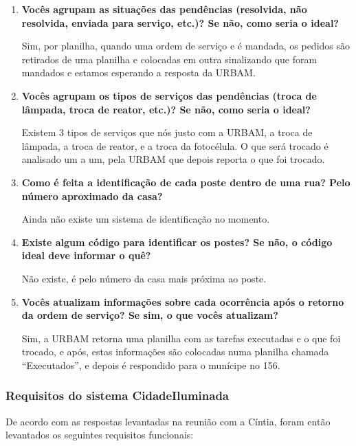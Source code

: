 \documentclass[
	article,			%
	11pt,				%
	oneside,			%
	a4paper,			%
	english,			%
	brazil,				%
	sumario=tradicional
	]{abntex2}
\begin{document}
\begin{enumerate}
\item \textbf{Vocês agrupam as situações das pendências (resolvida, não resolvida, enviada para serviço, etc.)? Se não, como seria o ideal?}

Sim, por planilha, quando uma ordem de serviço e é mandada, os pedidos são retirados de uma planilha e colocadas em outra sinalizando que foram mandados e estamos esperando a resposta da URBAM.

\item \textbf{Vocês agrupam os tipos de serviços das pendências (troca de lâmpada, troca de reator, etc.)? Se não, como seria o ideal?}

Existem 3 tipos de serviços que nós justo com a URBAM, a troca de lâmpada, a troca de reator, e a troca da fotocélula.
O que será trocado é analisado um a um, pela URBAM que depois reporta o que foi trocado.

\item \textbf{Como é feita a identificação de cada poste dentro de uma rua? Pelo número aproximado da casa?}

Ainda não existe um sistema de identificação no momento.

\item \textbf{Existe algum código para identificar os postes? Se não, o código ideal deve informar o quê?}

Não existe, é pelo número da casa mais próxima ao poste.

\item \textbf{Vocês atualizam informações sobre cada ocorrência após o retorno da ordem de serviço? Se sim, o que vocês atualizam?}

Sim, a URBAM retorna uma planilha com as tarefas executadas e o que foi trocado, e após, estas informações são colocadas numa planilha chamada “Executados”, e depois é respondido para o munícipe no 156.
\end{enumerate}

\subsubsection{Requisitos do sistema CidadeIluminada}

De acordo com as respostas levantadas na reunião com a Cíntia, foram então levantados os seguintes requisitos funcionais:
\end{document}
